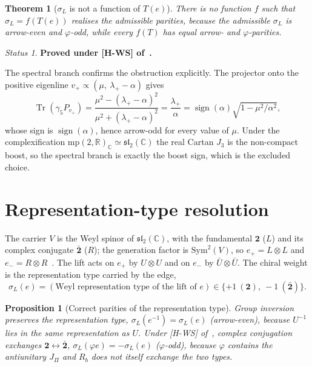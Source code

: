 \documentclass[11pt]{article}
\theoremstyle{plain}
\newtheorem{theorem}{Theorem}
\newtheorem{proposition}{Proposition}
\theoremstyle{remark}
\newtheorem*{status}{Status}
\newcommand{\JPi}{J_\Pi}
\newcommand{\sgn}{\operatorname{sign}}
\newcommand{\two}{\mathbf{2}}
\newcommand{\twobar}{\bar{\mathbf{2}}}
\begin{document}
    \begin{theorem}[$\sigma_L$ is not a function of $T(e)$]
There is no function $f$ such that $\sigma_L = f(T(e))$ realises the admissible parities, because the admissible
$\sigma_L$ is arrow-even and $\varphi$-odd, while every $f(T)$ has equal arrow- and $\varphi$-parities.
    \end{theorem}

    \begin{status}\textbf{Proved under [H-WS] of~\cite{Beau2026q11of}.}\end{status}

    The spectral branch confirms the obstruction explicitly.
    The projector onto the positive eigenline $v_+\propto(\mu,\ \lambda_+-\alpha)$ gives
    \begin{equation}
      \operatorname{Tr}(\gamma_5 P_{v_+})
      = \frac{\mu^2 - (\lambda_+-\alpha)^2}{\mu^2 + (\lambda_+-\alpha)^2}
      = \frac{\lambda_+}{\alpha}
      = \sgn(\alpha)\sqrt{1 - \mu^2/\alpha^2},
    \end{equation}
    whose sign is $\sgn(\alpha)$, hence arrow-odd for every value of $\mu$.
    Under the complexification $\mathrm{mp}(2,\mathbb{R})_{\mathbb{C}}\simeq\mathfrak{sl}_2(\mathbb{C})$ the real Cartan
    $J_3$ is the non-compact boost, so the spectral branch is exactly the boost sign, which is the excluded choice.

  \section{Representation-type resolution}

    The carrier $V$ is the Weyl spinor of $\mathfrak{sl}_2(\mathbb{C})$, with the fundamental $\two$ ($L$) and its complex
    conjugate $\twobar$ ($R$); the generation factor is $\mathrm{Sym}^2(V)$, so $e_+ = L\otimes L$ and $e_- = R\otimes
  R$~\cite[\S 6]{Beau2026q14}.
    The lift acts on $e_+$ by $U\otimes U$ and on $e_-$ by $\bar U\otimes\bar U$.
    The chiral weight is the representation type carried by the edge,
    \begin{equation}
      \sigma_L(e) = (\text{Weyl representation type of the lift of } e)\in\{+1\ (\two),\ -1\ (\twobar)\}.
    \end{equation}

    \begin{proposition}[Correct parities of the representation type]
Group inversion preserves the representation type, $\sigma_L(e^{-1}) = \sigma_L(e)$ (arrow-even), because $U^{-1}$ lies
in the same representation as $U$.
Under [H-WS] of~\cite{Beau2026q11of}, complex conjugation exchanges $\two\leftrightarrow\twobar$, $\sigma_L(\varphi e) =
-\sigma_L(e)$ ($\varphi$-odd), because $\varphi$ contains the antiunitary $\JPi$ and $R_b$ does not itself exchange the
two types.
    \end{proposition}
\end{document}
